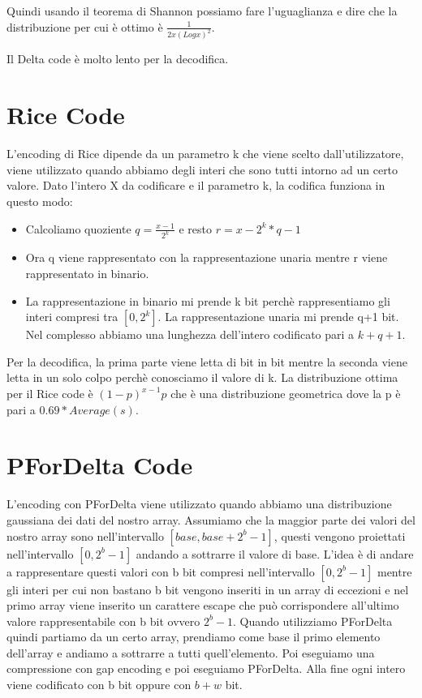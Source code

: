 \documentclass[14pt]{extreport}
\begin{document}
Quindi usando il teorema di Shannon possiamo fare l'uguaglianza e dire che la distribuzione per cui è ottimo è $\frac{1}{2x(Logx)^2}$.

Il Delta code è molto lento per la decodifica.

\section{Rice Code}

L'encoding di Rice dipende da un parametro k che viene scelto dall'utilizzatore, viene utilizzato quando abbiamo degli interi che sono tutti intorno ad un certo valore.
Dato l'intero X da codificare e il parametro k, la codifica funziona in questo modo:

\begin{itemize}
\item Calcoliamo quoziente $q=\frac{x-1}{2^k}$ e resto $r=x-2^k*q-1$
\item Ora q viene rappresentato con la rappresentazione unaria mentre r viene rappresentato in binario.
\item La rappresentazione in binario mi prende k bit perchè rappresentiamo gli interi compresi tra $[0,2^k]$. La rappresentazione unaria mi prende q+1 bit. Nel complesso abbiamo una lunghezza dell'intero codificato pari a $k+q+1$.
\end{itemize} 

Per la decodifica, la prima parte viene letta di bit in bit mentre la seconda viene letta in un solo colpo perchè conosciamo il valore di k.
La distribuzione ottima per il Rice code è $(1-p)^{x-1}p$ che è una distribuzione geometrica dove la p è pari a $0.69*Average(s)$.

\section{PForDelta Code}

L'encoding con PForDelta viene utilizzato quando abbiamo una distribuzione gaussiana dei dati del nostro array.
Assumiamo che la maggior parte dei valori del nostro array sono nell'intervallo $[base, base+2^b-1]$, questi vengono proiettati nell'intervallo $[0, 2^b-1]$ andando a sottrarre il valore di base.
L'idea è di andare a rappresentare questi valori con b bit compresi nell'intervallo $[0, 2^b-1]$ mentre gli interi per cui non bastano b bit vengono inseriti in un array di eccezioni e nel primo array viene inserito un carattere escape che può corrispondere all'ultimo valore rappresentabile con b bit ovvero $2^b-1$.
Quando utilizziamo PForDelta quindi partiamo da un certo array, prendiamo come base il primo elemento dell'array e andiamo a sottrarre a tutti quell'elemento. Poi eseguiamo una compressione con gap encoding e poi eseguiamo PForDelta.
Alla fine ogni intero viene codificato con b bit oppure con $b+w$ bit.
\end{document}
